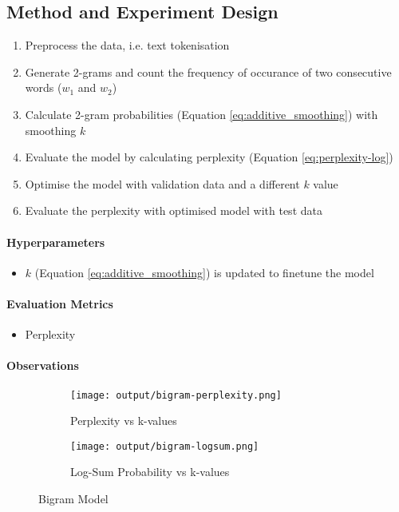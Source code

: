 \subsection*{Method and Experiment Design}

\begin{enumerate}
    \item Preprocess the data, i.e. text tokenisation
    \item Generate 2-grams and count the frequency of occurance of two consecutive words ($w_1$ and $w_2$)
    \item Calculate 2-gram probabilities (Equation \ref{eq:additive_smoothing}) with smoothing $k$
    \item Evaluate the model by calculating perplexity (Equation \ref{eq:perplexity-log})
    \item Optimise the model with validation data and a different $k$ value
    \item Evaluate the perplexity with optimised model with test data
\end{enumerate}


\paragraph{Hyperparameters}
\begin{itemize}
    \item $k$ (Equation \ref{eq:additive_smoothing}) is updated to finetune the model
\end{itemize}


\paragraph{Evaluation Metrics}
\begin{itemize}
    \item Perplexity
\end{itemize}


\paragraph{Observations}
\begin{figure}[h!]
    \centering
    
    \begin{subfigure}[b]{0.45\textwidth}
        \centering
        \texttt{[image: output/bigram-perplexity.png]}
        \caption{Perplexity vs k-values}
        \label{fig:bigram-perplexity}
    \end{subfigure}
    \hfill
    \begin{subfigure}[b]{0.45\textwidth}
        \centering
        \texttt{[image: output/bigram-logsum.png]}
        \caption{Log-Sum Probability vs k-values}
        \label{fig:bigram-logsum}
    \end{subfigure}
    
    \caption{Bigram Model}
    \label{fig:bigram}
\end{figure}

